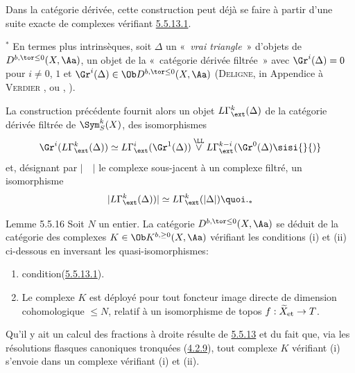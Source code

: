 \documentclass[10pt]{../fichiers-configuration-latex/smfart}
\begin{document}
Dans la catégorie dérivée, cette construction peut déjà se faire à
partir d'une suite exacte de complexes vérifiant \hyperref[XVII.par5.5.13.1]{5.5.13.1}.

${}^{\ast}$ En termes plus intrinsèques, soit $\Delta$ un « \emph{vrai triangle} »  d'objets de $D^{b,\tor\leq
0}(X,\Aa)$, \ie un objet de la « catégorie dérivée filtrée » avec $\Gr^{i}(\Delta)=0$ pour $i\neq 0$, $1$ et $\Gr^{i}(\Delta)\in
\Ob D^{b,\tor\leq 0}(X,\Aa)$ (\textsc{Deligne}, in Appendice à \textsc{Verdier}
\cite{SGA4-17:V2}, ou , ).

La construction précédente fournit alors un objet
$L\Gamma^{k}_{\ext}(\Delta)$ de la catégorie dérivée filtrée de
$\Sym^{k}_{S}(X)$, des isomorphismes
\[
\Gr^{i}(L\Gamma^{k}_{\ext}(\Delta))\simeq
L\Gamma^{i}_{\ext}(\Gr^{1}(\Delta))\overset{\LL}{\vee}L\Gamma^{k-i}_{\ext}
(\Gr^{0}(\Delta)\sisi{}{)}
\]
et, désignant par $\lvert\quad \rvert$ le complexe sous-jacent à un
complexe filtré, un isomorphisme
\[
\lvert L\Gamma^{k}_{\ext}(\Delta))\rvert \simeq L\Gamma^{k}_{\ext}(\lvert\Delta
\rvert){\quoi}.{}_{\ast}
\]

\begin{enonce*}{Lemme 5.5.16}
Soit $N$ un entier. La catégorie $D^{b,\tor\leq 0}(X,\Aa)$ se
déduit de la catégorie des complexes $K\in \Ob K^{b,\geq
0}(X,\Aa)$ vérifiant les conditions {\rm (i)} et {\rm (ii)}
ci-dessous en inversant les quasi-isomorphismes:
\begin{enumerate}
\renewcommand{\theenumi}{\roman{enumi}}
\renewcommand{\labelenumi}{(\theenumi)}
\item condition\pageoriginale (\hyperref[XVII.par5.5.13.1]{5.5.13.1}).

\item Le complexe $K$ est déployé pour tout foncteur image directe de
dimension cohomologique $\leq N$, relatif à un isomorphisme de topos
$f:\widetilde{X}_{\text{\rm et}}\rightarrow T$.
\end{enumerate}
\end{enonce*}

Qu'il y ait un calcul des fractions à droite résulte de \hyperref[XVII.subsubsec5.5.13]{5.5.13} et du
fait que, via les résolutions flasques canoniques tronquées (\hyperref[XVII.subsubsec4.2.9]{4.2.9}),
tout complexe $K$ vérifiant (i) s'envoie dans un complexe vérifiant
(i) et (ii).

\setcounter{subsubsection}{16}
\end{document}

